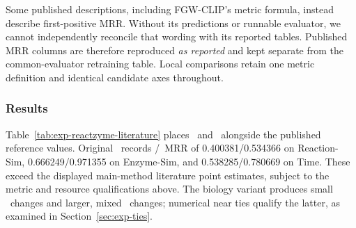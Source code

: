Some published descriptions, including FGW-CLIP's metric formula, instead
describe first-positive MRR. Without its predictions or runnable evaluator,
we cannot independently reconcile that wording with its reported tables.
Published MRR columns are therefore reproduced \emph{as reported} and kept
separate from the common-evaluator retraining table. Local comparisons retain
one metric definition and identical candidate axes throughout.

\subsubsection{Results}

Table~\ref{tab:exp-reactzyme-literature} places \methodname\ and \vfourBio\
alongside the published reference values. Original \methodname\ records
\expRtoE/\expEtoR\ MRR of 0.400381/0.534366 on Reaction-Sim,
0.666249/0.971355 on Enzyme-Sim, and 0.538285/0.780669 on Time. These exceed
the displayed main-method literature point estimates, subject to the metric
and resource qualifications above. The biology variant produces small
\expRtoE\ changes and larger, mixed \expEtoR\ changes; numerical near ties
qualify the latter, as examined in Section~\ref{sec:exp-ties}.

\begin{table}[htbp]
\centering\small
\caption{ReactZyme literature-reference comparison. The FGW-CLIP rows are
transcribed from Tables 3, 7, and 8 of arXiv:2512.08508v2; TIGER rows are its
main Table 1 values. Published MRR is retained as reported, while our rows use
Eq.~\eqref{eq:exp-mrr}. This table is not a local reproduction of TIGER or
FGW-CLIP, nor proof of equivalent pretraining resources or metric code.}
\label{tab:exp-reactzyme-literature}
\resizebox{\linewidth}{!}{}
\end{table}

\begin{table}[htbp]
\centering\small
\caption{Completed matched-data ReactZyme comparisons under the shared
all-positive MRR evaluator. For the four released families and corrected-loss
sensitivity, this compact table shows the same ESM2/MAT-2D features throughout;
the EnzGFM control also uses MAT-2D. This is a fixed presentation slice, not
the best feature pair chosen on test. All completed feature combinations are
listed in Appendix~\ref{app:exp-public}. Training budgets differ across methods.}
\label{tab:exp-reactzyme-retrained}
\resizebox{\linewidth}{!}{}
\end{table}

